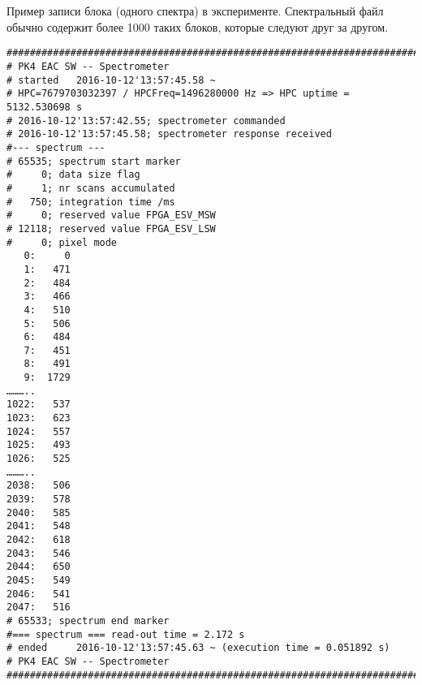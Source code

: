 \chapter{}
\label{app:app1}
Пример записи блока (одного спектра) в эксперименте. Спектральный файл обычно содержит более 1000 таких блоков, которые
следуют друг за другом.

\begin{small}
\begin{verbatim}
###############################################################################
# PK4 EAC SW -- Spectrometer
# started   2016-10-12'13:57:45.58 ~
# HPC=7679703032397 / HPCFreq=1496280000 Hz => HPC uptime = 5132.530698 s
# 2016-10-12'13:57:42.55; spectrometer commanded
# 2016-10-12'13:57:45.58; spectrometer response received
#--- spectrum ---
# 65535; spectrum start marker
#     0; data size flag
#     1; nr scans accumulated
#   750; integration time /ms
#     0; reserved value FPGA_ESV_MSW
# 12118; reserved value FPGA_ESV_LSW
#     0; pixel mode
   0:     0
   1:   471
   2:   484
   3:   466
   4:   510
   5:   506
   6:   484
   7:   451
   8:   491
   9:  1729
………..
1022:   537
1023:   623
1024:   557
1025:   493
1026:   525
………..
2038:   506
2039:   578
2040:   585
2041:   548
2042:   618
2043:   546
2044:   650
2045:   549
2046:   541
2047:   516
# 65533; spectrum end marker
#=== spectrum === read-out time = 2.172 s
# ended     2016-10-12'13:57:45.63 ~ (execution time = 0.051892 s)
# PK4 EAC SW -- Spectrometer
###############################################################################
\end{verbatim}
\end{small}

\chapter{}
\label{app:app2}